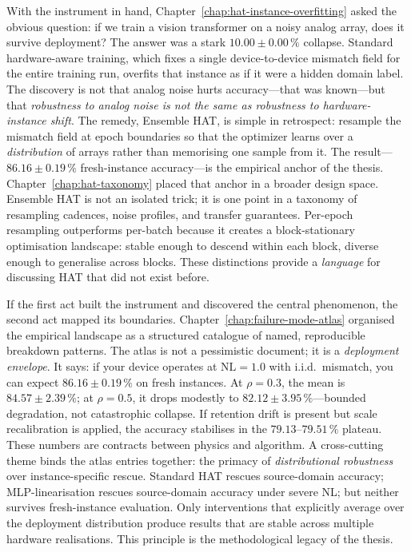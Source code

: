 With the instrument in hand, Chapter~\ref{chap:hat-instance-overfitting} asked the obvious question: if we train a vision transformer on a noisy analog array, does it survive deployment?  The answer was a stark $10.00\pm0.00\,\%$ collapse.  Standard hardware-aware training, which fixes a single device-to-device mismatch field for the entire training run, overfits that instance as if it were a hidden domain label.  The discovery is not that analog noise hurts accuracy---that was known---but that \emph{robustness to analog noise is not the same as robustness to hardware-instance shift}.  The remedy, Ensemble HAT, is simple in retrospect: resample the mismatch field at epoch boundaries so that the optimizer learns over a \emph{distribution} of arrays rather than memorising one sample from it.  The result---$86.16\pm0.19\,\%$ fresh-instance accuracy---is the empirical anchor of the thesis.  Chapter~\ref{chap:hat-taxonomy} placed that anchor in a broader design space.  Ensemble HAT is not an isolated trick; it is one point in a taxonomy of resampling cadences, noise profiles, and transfer guarantees.  Per-epoch resampling outperforms per-batch because it creates a block-stationary optimisation landscape: stable enough to descend within each block, diverse enough to generalise across blocks.  These distinctions provide a \emph{language} for discussing HAT that did not exist before.

If the first act built the instrument and discovered the central phenomenon, the second act mapped its boundaries.  Chapter~\ref{chap:failure-mode-atlas} organised the empirical landscape as a structured catalogue of named, reproducible breakdown patterns.  The atlas is not a pessimistic document; it is a \emph{deployment envelope}.  It says: if your device operates at $\mathrm{NL}=1.0$ with i.i.d.~mismatch, you can expect $86.16\pm0.19\,\%$ on fresh instances.  At $\rho=0.3$, the mean is $84.57\pm2.39\,\%$; at $\rho=0.5$, it drops modestly to $82.12\pm3.95\,\%$---bounded degradation, not catastrophic collapse.  If retention drift is present but scale recalibration is applied, the accuracy stabilises in the $79.13$--$79.51\,\%$ plateau.  These numbers are contracts between physics and algorithm.  A cross-cutting theme binds the atlas entries together: the primacy of \emph{distributional robustness} over instance-specific rescue.  Standard HAT rescues source-domain accuracy; MLP-linearisation rescues source-domain accuracy under severe NL; but neither survives fresh-instance evaluation.  Only interventions that explicitly average over the deployment distribution produce results that are stable across multiple hardware realisations.  This principle is the methodological legacy of the thesis.

